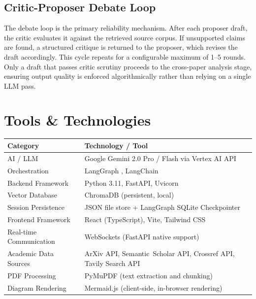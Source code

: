 \documentclass[12pt, a4paper]{article}
\begin{document}
\subsection{Critic-Proposer Debate Loop}
The debate loop is the primary reliability mechanism. After each proposer draft, the critic
evaluates it against the retrieved source corpus. If unsupported claims are found, a
structured critique is returned to the proposer, which revises the draft accordingly. This
cycle repeats for a configurable maximum of 1--5 rounds. Only a draft that passes critic
scrutiny proceeds to the cross-paper analysis stage, ensuring output quality is enforced
algorithmically rather than relying on a single LLM pass.

\section{Tools \& Technologies}

\renewcommand{\arraystretch}{1.4}
\begin{tabular}{|p{3.8cm}|p{8.8cm}|}
    \hline
    \textbf{Category} & \textbf{Technology / Tool} \\
    \hline
    AI / LLM & Google Gemini 2.0 Pro / Flash via Vertex AI API \\
    \hline
    Orchestration & LangGraph \cite{langgraph2024}, LangChain \\
    \hline
    Backend Framework & Python 3.11, FastAPI, Uvicorn \\
    \hline
    Vector Database & ChromaDB (persistent, local) \\
    \hline
    Session Persistence & JSON file store + LangGraph SQLite Checkpointer \\
    \hline
    Frontend Framework & React (TypeScript), Vite, Tailwind CSS \\
    \hline
    Real-time Communication & WebSockets (FastAPI native support) \\
    \hline
    Academic Data Sources & ArXiv API, Semantic~Scholar API, Crossref API, Tavily Search API \\
    \hline
    PDF Processing & PyMuPDF (text extraction and chunking) \\
    \hline
    Diagram Rendering & Mermaid.js (client-side, in-browser rendering) \\
    \hline
\end{tabular}
\end{document}
